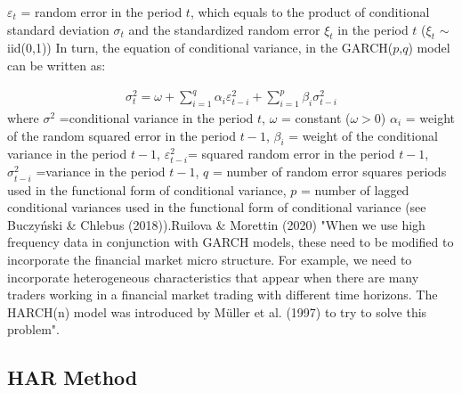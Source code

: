 \documentclass[a4paper,11pt,oneside]{book}
\begin{document}
$\varepsilon_t$ = random error in the period $t$, which equals to the
product of conditional standard deviation $\sigma_t$ and  the
standardized random error $\xi_t$ in the period $t$ ($\xi_t$ $\sim$ iid(0,1))
\newline\newline
In turn, the equation of conditional variance, in the GARCH($p$,$q$) model can be written as:


\begin{equation}
\begin{aligned}
\sigma^2_t = \omega + \sum_{i=1}^{q}\alpha_{i}\varepsilon^{2}_{t-i} + \sum_{i=1}^{p}\beta_{i} \sigma^2_{t-i}
\label{7}
\end{aligned}
\end{equation}
where $\sigma^2$ =conditional variance in the period $t$,\newline
$\omega$ = constant ($\omega>0$)\newline
$\alpha_{i}$ = weight of the random squared error in the period $t-1$,\newline
$\beta_{i}$ = weight of the conditional variance in the period $t-1$,\newline
$\varepsilon^{2}_{t-i}$= squared random error in the period $t-1$,\newline
$\sigma^2_{t-i}$ =variance in the period $t-1$,\newline
$q$ = number of random error squares periods used in the functional form of conditional variance,\newline
$p$ = number of lagged conditional variances used in the
functional form of conditional variance (see Buczyński \& Chlebus (2018)).\newline\newline Ruilova \& Morettin (2020) "When we use high frequency data in conjunction with GARCH models, these need to be modified
to incorporate the financial market micro structure. For example, we need to incorporate heterogeneous
characteristics that appear when there are many traders working in a financial market trading with
different time horizons. The HARCH(n) model was introduced by Müller et al. (1997) to try to solve this problem".

\subsection{HAR Method}
\end{document}

